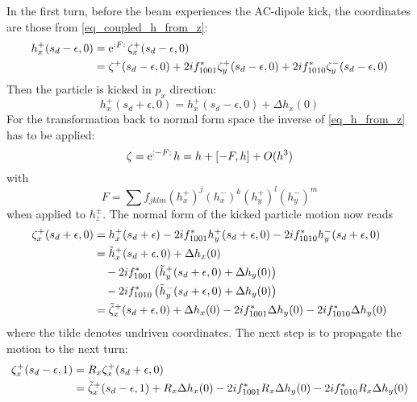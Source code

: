 In the first turn, before the beam experiences the AC-dipole kick, the coordinates are those from
\eqref{eq_coupled_h_from_z}:
%
\begin{align}
  h_x^+(s_d-\epsilon, 0) &=  \text{e}^{{:}F{:}\,} \zeta_x^+(s_d-\epsilon, 0)\notag \\
  &=  \zeta^+(s_d-\epsilon,0)
    + 2if_{1001}^*\zeta_y^+(s_d-\epsilon, 0)
    + 2if_{1010}^*\zeta_y^-(s_d-\epsilon,0)
\end{align}
%
Then the particle is kicked in $p_x$ direction:
%
\begin{equation}
  h_x^+(s_d+\epsilon, 0) =  h_x^+(s_d - \epsilon,0) + \Delta h_x(0)
\end{equation}
%
For the transformation back to normal form space the inverse of \eqref{eq_h_from_z} has to be applied:
%
\begin{equation}
  \zeta = \text{e}^{{:}-F{:}\,} h = h + [-F,h] + O(h^3)
  \label{eq_coupled_h_after_kick}
\end{equation}
%
with
%
\begin{equation}
  F = \sum f_{jklm}\left( h_x^+ \right)^j \left( h_x^- \right)^k \left( h_y^+ \right)^l \left( h_y^- \right)^m
\end{equation}
%
when applied to $h_z^\pm$.
The normal form of the kicked particle motion now reads
%
\begin{align}
    \zeta_x^+(s_d+\epsilon, 0)
        &= h_x^+(s_d+\epsilon)
            - 2if_{1001}^* h_y^+(s_d+\epsilon, 0)
            - 2if_{1010}^* h_y^-(s_d+\epsilon, 0)
    \notag\\
        &= \tilde{h}_x^+(s_d+\epsilon,0) + \Delta h_x(0)
            \notag \\ &\quad - 2if_{1001}^* \left(\tilde{h}_y^+(s_d+\epsilon, 0) + \Delta h_y(0) \right)
            \notag \\ &\quad - 2if_{1010}^* \left(\tilde{h}_y^-(s_d+\epsilon, 0) + \Delta h_y(0) \right)
    \notag \\
        &= \tilde{\zeta}_x^+(s_d+\epsilon, 0) + \Delta h_x(0)
            - 2if_{1001}^* \Delta h_y(0)
            - 2if_{1010}^* \Delta h_y(0)
\end{align}
%
where the tilde denotes undriven coordinates. The next step is to propagate the motion to the next
turn:
%
\begin{align}
    \zeta_x^+(s_d-\epsilon, 1) &= R_x\zeta_x^+(s_d+\epsilon, 0) \notag \\
        &= \tilde{\zeta}_x^+(s_d-\epsilon, 1) + R_x\Delta h_x(0)
            - 2if_{1001}^* R_x\Delta h_y(0)
            - 2if_{1010}^* R_x\Delta h_y(0)
\end{align}
